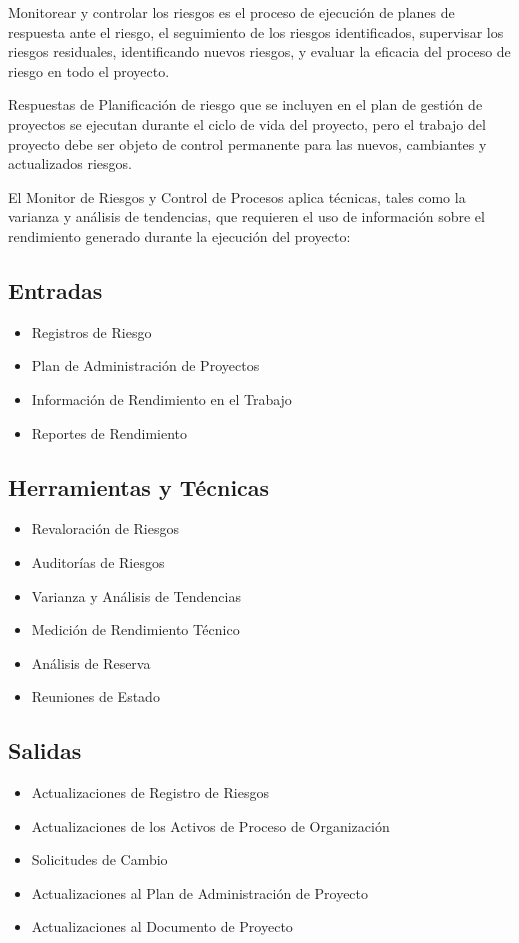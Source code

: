 Monitorear y controlar los riesgos es el proceso de ejecución de planes de respuesta ante el riesgo, el seguimiento de los riesgos identificados, supervisar los riesgos residuales, identificando nuevos riesgos, y evaluar la eficacia del proceso de riesgo en todo el proyecto.

Respuestas de Planificación de riesgo que se incluyen en el plan de gestión de proyectos se ejecutan durante el ciclo de vida del proyecto, pero el trabajo del proyecto debe ser objeto de control permanente para las nuevos, cambiantes y actualizados riesgos.

El Monitor de Riesgos y Control de Procesos aplica técnicas, tales como la varianza y análisis de tendencias, que requieren el uso de información sobre el rendimiento generado durante la ejecución del proyecto:

\subsection{Entradas}

\begin{itemize}
	\item Registros de Riesgo
	\item Plan de Administración de Proyectos
	\item Información de Rendimiento en el Trabajo
	\item Reportes de Rendimiento
\end{itemize}

\subsection{Herramientas y Técnicas}

\begin{itemize}
	\item Revaloración de Riesgos
	\item Auditorías de Riesgos
	\item Varianza y Análisis de Tendencias
	\item Medición de Rendimiento Técnico
	\item Análisis de Reserva
	\item Reuniones de Estado
\end{itemize}

\subsection{Salidas}

\begin{itemize}
	\item Actualizaciones de Registro de Riesgos
	\item Actualizaciones de los Activos de Proceso de Organización
	\item Solicitudes de Cambio
	\item Actualizaciones al Plan de Administración de Proyecto
	\item Actualizaciones al Documento de Proyecto
\end{itemize}


